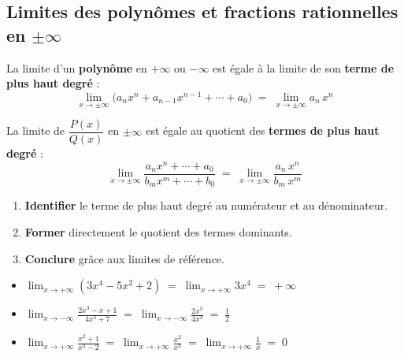 \subsection{Limites des polyn\^{o}mes et fractions rationnelles en \texorpdfstring{$\pm\infty$}{±∞}}

\begin{theoreme}
  La limite d'un \textbf{polyn\^{o}me} en $+\infty$ ou $-\infty$ est
  \'{e}gale \`{a} la limite de son \textbf{terme de plus haut degr\'{e}} :
  \[
    \lim_{x \to \pm\infty}
    \bigl(a_n x^n + a_{n-1}x^{n-1} + \cdots + a_0\bigr)
    \;=\;
    \lim_{x \to \pm\infty} a_n\,x^n
  \]
\end{theoreme}

\begin{theoreme}
  La limite de $\dfrac{P(x)}{Q(x)}$ en $\pm\infty$ est \'{e}gale au
  quotient des \textbf{termes de plus haut degr\'{e}} :
  \[
    \lim_{x \to \pm\infty}
    \frac{a_n x^n + \cdots + a_0}{b_m x^m + \cdots + b_0}
    \;=\;
    \lim_{x \to \pm\infty} \frac{a_n\,x^n}{b_m\,x^m}
  \]
\end{theoreme}

\begin{methode}
  \begin{enumerate}
    \item \textbf{Identifier} le terme de plus haut degr\'{e} au num\'{e}rateur
          et au d\'{e}nominateur.
    \item \textbf{Former} directement le quotient des termes dominants.
    \item \textbf{Conclure} gr\^{a}ce aux limites de r\'{e}f\'{e}rence.
  \end{enumerate}
\end{methode}
\newpage

\begin{exemple}[R\'{e}solus]
  \begin{itemize}
    \item $\displaystyle\lim_{x \to +\infty}(3x^4 - 5x^2 + 2)
          \;=\; \lim_{x \to +\infty} 3x^4 \;=\; +\infty$
    \medskip
    \item $\displaystyle\lim_{x \to -\infty}
          \frac{2x^3 - x + 1}{4x^3 + 7}
          \;=\; \lim_{x \to -\infty} \frac{2x^3}{4x^3}
          \;=\; \frac{1}{2}$
    \medskip
    \item $\displaystyle\lim_{x \to +\infty}
          \frac{x^2 + 1}{x^3 - 2}
          \;=\; \lim_{x \to +\infty} \frac{x^2}{x^3}
          \;=\; \lim_{x \to +\infty} \frac{1}{x} \;=\; 0$
  \end{itemize}
\end{exemple}


